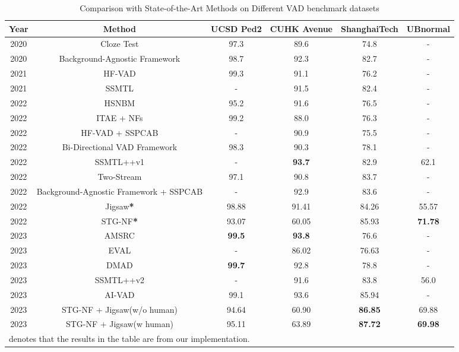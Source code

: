 \documentclass[conference]{IEEEtran}
\begin{document}
\begin{table*}[h]
\caption{Comparison with State-of-the-Art Methods on Different VAD benchmark datasets}
\begin{center}
\scalebox{1.1}
{
\begin{tabular}{c c c c c c}
\hline
\textbf{Year} & \textbf{Method} & \textbf{UCSD Ped2} & \textbf{CUHK Avenue}& \textbf{ShanghaiTech}& \textbf{UBnormal} \\
\hline
2020 & Cloze Test\cite{cloze} & 97.3 & 89.6 & 74.8 & - \\
2020 & Background-Agnostic Framework\cite{georgescu2021background} & 98.7 & 92.3 & 82.7 & - \\
2021 & HF-VAD\cite{liu2021hybrid} & 99.3 & 91.1 & 76.2 & - \\
2021 & SSMTL\cite{multitask} & - & 91.5 & 82.4 & - \\
2022 & HSNBM\cite{hierarchical} & 95.2 & 91.6 & 76.5 & - \\
2022 & ITAE + NFs\cite{implicit} & 99.2 & 88.0 & 76.3 & - \\
2022 & HF-VAD + SSPCAB\cite{2022SSPCAB} & - & 90.9 & 75.5 & - \\
2022 & Bi-Directional VAD Framework\cite{bi-directional} & 98.3 & 90.3 & 78.1 & - \\
2022 & SSMTL++v1\cite{ssmtl++} & - & \textbf{93.7} & 82.9 & 62.1 \\
2022 & Two-Stream\cite{knowledge} & 97.1 & 90.8 & 83.7 & - \\
2022 & Background-Agnostic Framework + SSPCAB\cite{2022SSPCAB} & - & 92.9 & 83.6 & - \\
2022 & Jigsaw\textbf{*}\cite{jigsaw} & 98.88 & 91.41 & 84.26 & 55.57 \\
2022 & STG-NF\textbf{*}\cite{STG-NF} & 93.07 & 60.05 & 85.93 & \textbf{71.78} \\
2023 & AMSRC\cite{huang2023amsrc} & \textbf{99.5} & \textbf{93.8} & 76.6 & - \\
2023 & EVAL\cite{singh2023eval} & - & 86.02 & 76.63 & - \\
2023 & DMAD\cite{liu2023diversity} & \textbf{99.7} & 92.8 & 78.8 & - \\
2023 & SSMTL++v2\cite{ssmtl++} & - & 91.6 & 83.8 & 56.0 \\
2023 & AI-VAD\cite{attribute} & 99.1 & 93.6 & 85.94 & - \\
\hline
2023 & STG-NF + Jigsaw(w/o human) & 94.64 & 60.90 & \textbf{86.85} & 69.88 \\
2023 & STG-NF + Jigsaw(w human) & 95.11 & 63.89 & \textbf{87.72} & \textbf{69.98} \\
\hline
\multicolumn{4}{l}{denotes that the results in the table are from our implementation.}
\end{tabular}
}
\label{tab3}
\end{center}
\end{table*}
\end{document}
